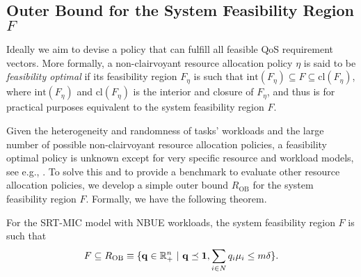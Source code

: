 \documentclass[prodmode,acmtompecs]{acmsmall}
\newcommand{\reqvec}{\mathbf{q}}
\newcommand{\feasibilityRegion}{F}
\newcommand{\fullUserSet}{N}
\newcommand{\myComments}[1]{}
\newif\ifdissertation
\newcommand{\dissertationStart}{\ifdissertation  \myComments{Dissertation version: }}
\newcommand{\commentEnd}{\myComments{End}}
\begin{document}
\subsection{Outer Bound for the System Feasibility Region $\feasibilityRegion$}
\label{subsection_outer_bound_for_F}
Ideally we aim to devise a policy that can fulfill all feasible QoS requirement vectors. More formally, a non-clairvoyant resource allocation policy $\eta$ is said to be {\em feasibility optimal} if its feasibility region $\feasibilityRegion_\eta$ is such that $\text{int}(\feasibilityRegion_\eta) \subseteq F \subseteq \text{cl}(\feasibilityRegion_\eta)$, where $\text{int}(\feasibilityRegion_\eta)$ and $\text{cl}(\feasibilityRegion_\eta)$ is the interior and closure of $\feasibilityRegion_\eta$, and thus is for practical purposes equivalent to the system feasibility region $\feasibilityRegion$. 

\dissertationStart
Ideally we wish to devise a policy that can fulfill all feasible QoS requirement vectors. More formally, a non-clairvoyant resource allocation policy $\eta$ is said to be {\em feasibility optimal} if its feasibility region $\feasibilityRegion_\eta$ is such that $\text{int}(\feasibilityRegion_\eta) \subseteq F \subseteq \text{cl}(\feasibilityRegion_\eta)$, where $\text{int}(\feasibilityRegion_\eta)$ and $\text{cl}(\feasibilityRegion_\eta)$ is the interior and closure of $\feasibilityRegion_\eta$. In other words, a policy $\eta$ is feasibility optimal if $\feasibilityRegion_\eta$ is different from the feasibility region $\feasibilityRegion$ by at most a boundary, and therefore, is equivalent to $\feasibilityRegion$ for practical purposes. 
\commentEnd\fi

\dissertationStart
Intuitively, a feasibility optimal non-clairvoyant design will orchestrate task scheduling across the $m$ cores. For example, the system might choose to process tasks with the maximum conditional probability of success to maximize the expected number of task completions in some periods while guaranteeing fairness and thus the required $\reqvec$ of users in other periods. 
\commentEnd\fi

Given the heterogeneity and randomness of tasks' workloads and the large number of possible non-clairvoyant resource allocation policies, a feasibility optimal policy is unknown except for very specific resource and workload models, see e.g., \cite{HoK12A}. To solve this and to provide a benchmark to evaluate other resource allocation policies, we develop a simple outer bound $R_{\text{OB}}$ for the system feasibility region $F$. 
Formally, we have the following theorem. 
\begin{theorem}
\label{thm_optimal_benchmark}
For the SRT-MIC  model with NBUE workloads, the system feasibility region $F$ is such that 
$$
F \subseteq R_{\textnormal{OB}} \equiv \{ \reqvec \in \mathbb R^n_+ ~|~ \reqvec \preceq \mathbf{1}, \sum\limits_{i\in \fullUserSet} q_i\mu_i \leq m\delta \}. 
$$
\end{theorem}
\end{document}

